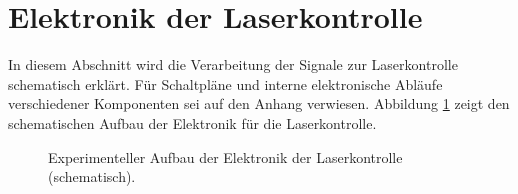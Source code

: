 \section{Elektronik der Laserkontrolle}\label{sec:elektronik_laserkontrolle} In
diesem Abschnitt wird die Verarbeitung der Signale zur Laserkontrolle schematisch erklärt. Für
Schaltpläne und interne elektronische Abläufe verschiedener Komponenten sei auf
den Anhang verwiesen. Abbildung \ref{fig:experimenteller_aufbau_elektronik_laserkontrolle} zeigt den
schematischen Aufbau der Elektronik für die Laserkontrolle.\par
\begin{figure}[h]
 	\centering
	\caption[Experimenteller Aufbau der Laserkontollelektronik,
	schematisch]{Experimenteller Aufbau der Elektronik der Laserkontrolle
	(schematisch).}\label{fig:experimenteller_aufbau_elektronik_laserkontrolle}
\end{figure}

